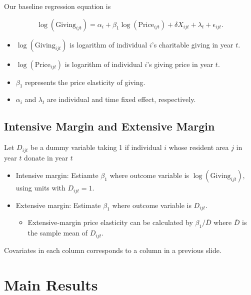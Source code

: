 \documentclass[ review  , 3p ]{elsarticle}
\providecommand{\tightlist}{%
  \setlength{\itemsep}{0pt}\setlength{\parskip}{0pt}}
\begin{document}
  Our baseline regression equation is
  
  \[
      \log(\text{Giving}_{ijt}) = 
      \alpha_i + \beta_1 \log(\text{Price}_{ijt}) + \delta X_{ijt} + \lambda_t + \epsilon_{ijt}.
  \]
  
  \begin{itemize}
  \tightlist
  \item
    \(\log(\text{Giving}_{ijt})\) is logarithm of individual \(i\)'s charitable giving in year \(t\).
  \item
    \(\log(\text{Price}_{ijt})\) is logarithm of individual \(i\)'s giving price in year \(t\).
  \item
    \(\beta_1\) represents the price elasticity of giving.
  \item
    \(\alpha_i\) and \(\lambda_t\) are individual and time fixed effect, respectively.
  \end{itemize}
  
  \hypertarget{intensive-margin-and-extensive-margin}{%
  \subsection{Intensive Margin and Extensive Margin}\label{intensive-margin-and-extensive-margin}}
  
  Let \(D_{ijt}\) be a dummy variable taking 1 if individual \(i\) whose resident area \(j\) in year \(t\) donate in year \(t\)
  
  \begin{itemize}
  \tightlist
  \item
    Intensive margin: Estiamte \(\beta_1\) where outcome variable is \(\log(\text{Giving}_{ijt})\), using units with \(D_{ijt} = 1\).
  \item
    Extensive margin: Estimate \(\beta_1\) where outcome variable is \(D_{ijt}\).
  
    \begin{itemize}
    \tightlist
    \item
      Extensive-margin price elasticity can be calculated by \(\beta_1/\bar{D}\) where \(\bar{D}\) is the sample mean of \(D_{ijt}\).
    \end{itemize}
  \end{itemize}
  
  Covariates in each column corresponds to a column in a previous slide.
  
  \hypertarget{main-results}{%
  \section{Main Results}\label{main-results}}
  
\end{document}
